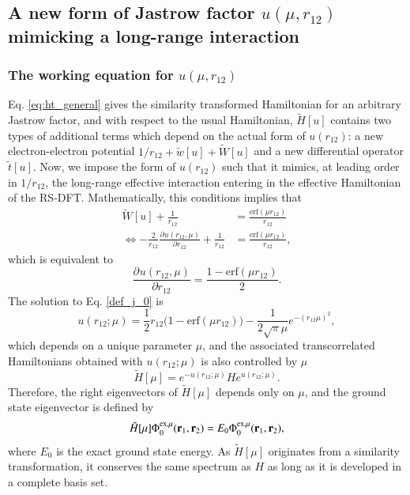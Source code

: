 \documentclass[aip,jcp,reprint,noshowkeys,superscriptaddress]{revtex4-1}
\newcommand{\deriv}[3]{\frac{\partial^{#3} #1}{\partial {#2}^{#3}}}
\newcommand{\br}[0]{{\bf {r}}}
\newcommand{\phimu}[0]{\Phi^{\text{ex},\mu}_0}
\begin{document}
\subsection{A new form of Jastrow factor $u(\mu,r_{12})$ mimicking a long-range interaction}
\subsubsection{The working equation for $u(\mu,r_{12})$ }
Eq. \eqref{eq:ht_general} gives the similarity transformed Hamiltonian for an arbitrary Jastrow factor, 
and with respect to the usual Hamiltonian, $\tilde{H}[u]$ contains two types of additional terms which depend on the actual form of $u(r_{12})$: 
a new electron-electron potential $1/r_{12} + \tilde{w}[u]+ \tilde{W}[u]$ and a new differential operator  $\tilde{t}[u] $.  
Now, we impose the form of $u(r_{12})$ such that it mimics, at leading order in $1/r_{12}$, the long-range effective interaction entering in the effective Hamiltonian of the RS-DFT. 
Mathematically, this conditions implies that 
\begin{equation}
 \begin{aligned}
 \label{def_j_00}
 \tilde{W}[u] + \frac{1}{r_{12}}&= \frac{\text{erf}(\mu r_{12})}{r_{12}} \\ 
\Leftrightarrow -\frac{2}{r_{12}} \deriv{u(r_{12},\mu)}{r_{12}}{} + \frac{1}{r_{12}} & = \frac{\text{erf}(\mu r_{12})}{r_{12}}, 
 \end{aligned}
\end{equation}
which is equivalent to 
\begin{equation}
 \label{def_j_0}
 \deriv{u(r_{12},\mu)}{r_{12}}{} = \frac{1 - \text{erf}(\mu r_{12})}{2}.
\end{equation}
The solution to Eq. \eqref{def_j_0} is 
\begin{equation}
 \label{eq:def_j}
 u(r_{12};\mu) = \frac{1}{2}r_{12}\bigg( 1 - \text{erf}(\mu r_{12})  \bigg) - \frac{1}{2\sqrt{\pi}\mu}e^{-(r_{12}\mu)^2},
\end{equation}
which depends on a unique parameter $\mu$,  
and the associated transcorrelated Hamiltonians obtained with $u(r_{12};\mu)$ is also controlled by $\mu$
\begin{equation}
 \label{eq:def_ht_mu}
 \tilde{H}[\mu] = e^{-u(r_{12};\mu)} H e^{u(r_{12};\mu)}. 
\end{equation}
Therefore, the right eigenvectors of $\tilde{H}[\mu]$ depends only on $\mu$, and the ground state eigenvector is defined by 
\begin{equation}
 \tilde{H}[\mu] \phimu(\br{}_{1},\br{}_{2}) = E_0 \phimu(\br{}_{1},\br{}_{2}), 
\end{equation}
where $E_0$ is the exact ground state energy. 
As $\tilde{H}[\mu]$ originates from a similarity transformation, it conserves the same spectrum as $H$ as long as it is developed in a complete basis set. 
\end{document}
